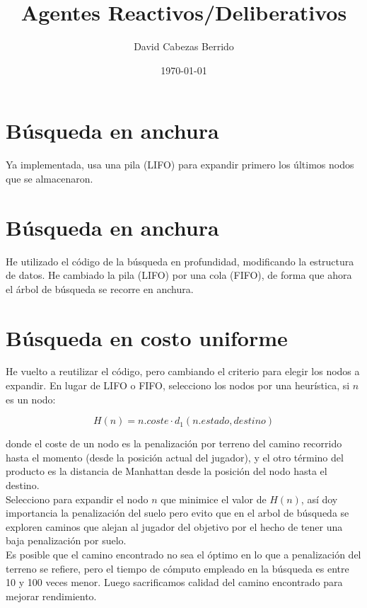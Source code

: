 \documentclass{article}
\begin{document}
\title{Agentes Reactivos/Deliberativos}
\author{David Cabezas Berrido}
\date{\today}
\maketitle

\section{Búsqueda en anchura}

Ya implementada, usa una pila (LIFO) para expandir primero los últimos
nodos que se almacenaron.

\section{Búsqueda en anchura}

He utilizado el código de la búsqueda en profundidad, modificando la
estructura de datos. He cambiado la pila (LIFO) por una cola (FIFO),
de forma que ahora el árbol de búsqueda se recorre en anchura.

\section{Búsqueda en costo uniforme}

He vuelto a reutilizar el código, pero cambiando el criterio para
elegir los nodos a expandir. En lugar de LIFO o FIFO, selecciono los
nodos por una heurística, si $n$ es un nodo:

\[H(n)=n.coste\cdot d_1(n.estado, destino)\]

donde el coste de un nodo es la penalización por terreno del camino
recorrido hasta el momento (desde la posición actual del jugador), y
el otro término del producto es la distancia de Manhattan desde la
posición del nodo hasta el destino. \\

Selecciono para expandir el nodo $n$ que minimice el valor de $H(n)$,
así doy importancia la penalización del suelo pero evito que
en el arbol de búsqueda se exploren caminos que alejan al jugador del
objetivo por el hecho de tener una baja penalización por suelo. \\

Es posible que el camino encontrado no sea el óptimo en lo que a
penalización del terreno se refiere, pero el tiempo de cómputo
empleado en la búsqueda es entre 10 y 100 veces menor. Luego
sacrificamos calidad del camino encontrado para mejorar rendimiento. \\
\end{document}
